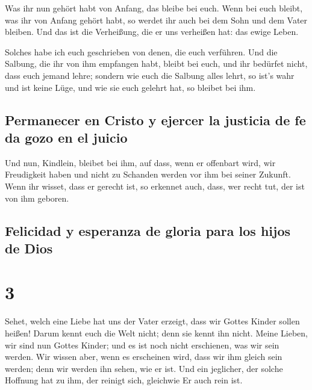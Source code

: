  Was ihr nun gehört habt von Anfang, das bleibe bei euch.
Wenn bei euch bleibt, was ihr von Anfang gehört habt, so werdet ihr auch
bei dem Sohn und dem Vater bleiben.  Und das ist die
Verheißung, die er uns verheißen hat: das ewige Leben.

 Solches habe ich euch geschrieben von denen, die euch
verführen.  Und die Salbung, die ihr von ihm empfangen
habt, bleibt bei euch, und ihr bedürfet nicht, dass euch jemand lehre;
sondern wie euch die Salbung alles lehrt, so ist's wahr und ist keine
Lüge, und wie sie euch gelehrt hat, so bleibet bei ihm.

\hypertarget{permanecer-en-cristo-y-ejercer-la-justicia-de-fe-da-gozo-en-el-juicio}{%
\subsection{Permanecer en Cristo y ejercer la justicia de fe da gozo en
el
juicio}\label{permanecer-en-cristo-y-ejercer-la-justicia-de-fe-da-gozo-en-el-juicio}}

 Und nun, Kindlein, bleibet bei ihm, auf dass, wenn er
offenbart wird, wir Freudigkeit haben und nicht zu Schanden werden vor
ihm bei seiner Zukunft.  Wenn ihr wisset, dass er gerecht
ist, so erkennet auch, dass, wer recht tut, der ist von ihm geboren.

\hypertarget{felicidad-y-esperanza-de-gloria-para-los-hijos-de-dios}{%
\subsection{Felicidad y esperanza de gloria para los hijos de
Dios}\label{felicidad-y-esperanza-de-gloria-para-los-hijos-de-dios}}

\hypertarget{section-2}{%
\section{3}\label{section-2}}

 Sehet, welch eine Liebe hat uns der Vater erzeigt, dass
wir Gottes Kinder sollen heißen! Darum kennt euch die Welt nicht; denn
sie kennt ihn nicht.  Meine Lieben, wir sind nun Gottes
Kinder; und es ist noch nicht erschienen, was wir sein werden. Wir
wissen aber, wenn es erscheinen wird, dass wir ihm gleich sein werden;
denn wir werden ihn sehen, wie er ist.  Und ein jeglicher,
der solche Hoffnung hat zu ihm, der reinigt sich, gleichwie Er auch rein
ist.

